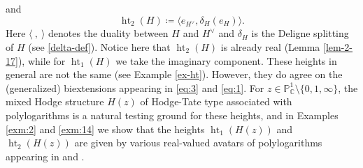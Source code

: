 \documentclass[11pt,a4paper]{amsart}
\newcommand{\C}{\mathds{C}}
\renewcommand{\P}{\mathds{P}}
\DeclareMathOperator{\Ht}{ht}
\numberwithin{equation}{section}
\theoremstyle{plain}
\theoremstyle{definition}
\begin{document}
and
\begin{displaymath}
\Ht_{2}(H)\coloneqq \langle e_{H^{\vee}}, \delta_{H}(e_{H})\rangle.
\end{displaymath}
Here $\langle~,~\rangle$ denotes the duality between $H$ and
$H^{\vee}$ and $\delta_{H}$ is the Deligne splitting of $H$ (see
\eqref{delta-def}). Notice here that $\Ht_{2}(H)$ is already real
(Lemma 
\ref{lem-2-17}), while for $\Ht_{1}(H)$ we take the imaginary
component. These heights in general are not the same (see Example
\ref{ex-ht}). However, they do agree on the (generalized)
biextensions appearing in \eqref{eq:3} and \eqref{eq:1}. For $z\in
\P^{1}_{\C}\setminus \{0,1,\infty\}$, the mixed Hodge 
structure $H(z)$ of Hodge-Tate type associated with polylogarithms is a
natural testing ground for these heights, and in Examples \ref{exm:2}
and \ref{exm:14} 
we show that the heights $\Ht_{1}(H(z))$ and $\Ht_{2}(H(z))$ are given
by various real-valued avatars of polylogarithms appearing in
\cite{brown04:_singl} and 
\cite{beilinsondeligne:_inter_zagier}.  
\end{document}
